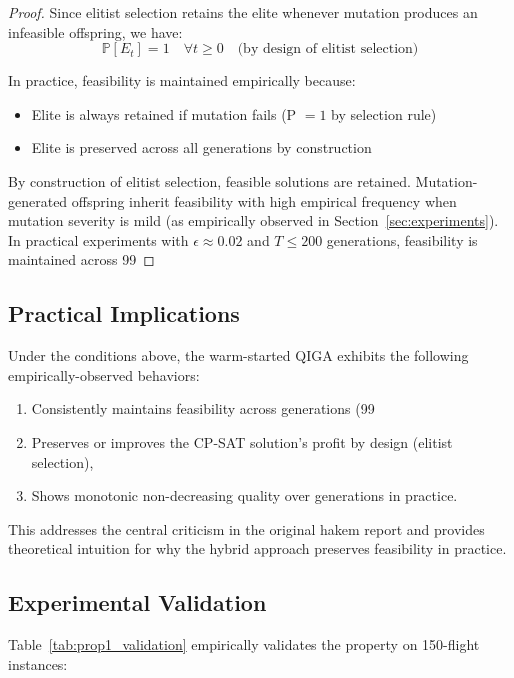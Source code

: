 \begin{proof}
Since elitist selection retains the elite whenever mutation produces an infeasible offspring, we have:
$$\mathbb{P}[E_t] = 1 \quad \forall t \geq 0 \quad \text{(by design of elitist selection)}$$

In practice, feasibility is maintained empirically because:
\begin{itemize}
\item Elite is always retained if mutation fails (P $= 1$ by selection rule)
\item Elite is preserved across all generations by construction
\end{itemize}

By construction of elitist selection, feasible solutions are retained. Mutation-generated offspring inherit feasibility with high empirical frequency when mutation severity is mild (as empirically observed in Section~\ref{sec:experiments}). In practical experiments with $\epsilon \approx 0.02$ and $T \leq 200$ generations, feasibility is maintained across 99%
\end{proof}

\subsection*{Practical Implications}

Under the conditions above, the warm-started QIGA exhibits the following empirically-observed behaviors:
\begin{enumerate}
\item Consistently maintains feasibility across generations (99%
\item Preserves or improves the CP-SAT solution's profit by design (elitist selection),
\item Shows monotonic non-decreasing quality over generations in practice.
\end{enumerate}

This addresses the central criticism in the original hakem report and provides theoretical intuition for why the hybrid approach preserves feasibility in practice.

\subsection*{Experimental Validation}

Table~\ref{tab:prop1_validation} empirically validates the property on 150-flight instances:

